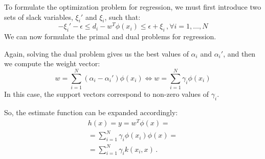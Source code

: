 To formulate the optimization problem for regression, we must first introduce two sets of slack variables, $\xi_i'$ and $\xi_i$, such that:
\begin{equation*}
    -\xi_i' - \epsilon \leq d_i - w^T\phi(x_i) \leq \epsilon + \xi_i \,, \forall i = 1, \dots , N
\end{equation*}
We can now formulate the primal and dual problems for regression.


Again, solving the dual problem gives us the best values of $\alpha_i$ and $\alpha_i'$, and then we compute the weight vector:
\begin{equation*}
    w = \sum_{i=1}^N (\alpha_i - \alpha_i')\phi(x_i) \iff w = \sum_{i=1}^N \gamma_i \phi(x_i)
\end{equation*}
In this case, the support vectors correspond to non-zero values of $\gamma_i$.

So, the estimate function can be expanded accordingly:
\begin{align*}
    h(x) = y = w^T \phi(x) = \\
    = \sum_{i=1}^N \gamma_i \phi(x_i) \phi(x) = \\
    = \sum_{i=1}^N \gamma_i k(x_i,x) \,.
\end{align*}

